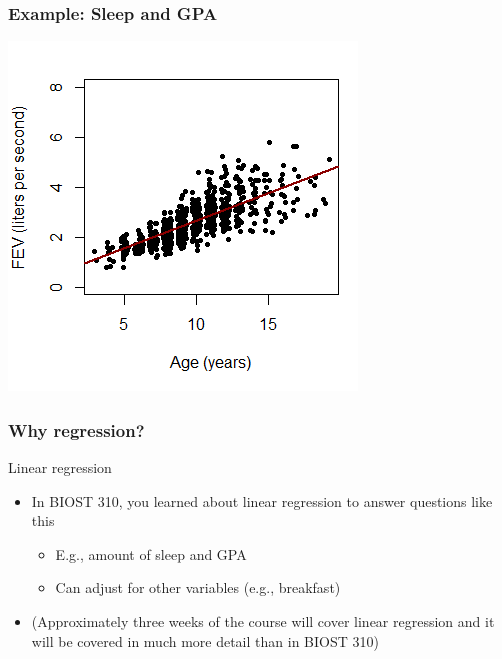 \documentclass[12pt, 
hyperref={colorlinks=true, linkcolor=blue, urlcolor=cyan}]{beamer}
\begin{document}
\begin{frame}
\frametitle{Example: Sleep and GPA} %
\center \includegraphics[height=0.8\textheight]{./intro_scatterplot} %
\end{frame}

\begin{frame}
\frametitle{Why regression?} 
Linear regression
\begin{itemize}
\item In BIOST 310, you learned about linear regression to answer questions like this
	\begin{itemize} %
	\item E.g., amount of sleep and GPA
	\item Can adjust for other variables (e.g., breakfast)
	\end{itemize}
\item (Approximately three weeks of the course will cover linear regression and it will be covered in much more detail than in BIOST 310)
\end{itemize}
\end{frame}
\end{document}
